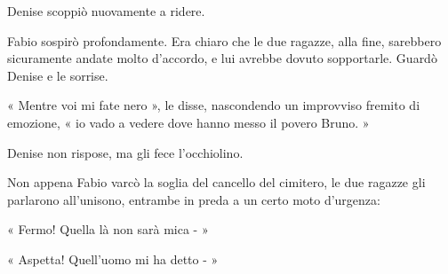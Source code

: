 Denise scoppiò nuovamente a ridere.

Fabio sospirò profondamente. Era chiaro che le due ragazze, alla fine, sarebbero sicuramente andate molto d'accordo, e lui avrebbe dovuto sopportarle. Guardò Denise e le sorrise.

« Mentre voi mi fate nero », le disse, nascondendo un improvviso fremito di emozione, « io vado a vedere dove hanno messo il povero Bruno. »

Denise non rispose, ma gli fece l'occhiolino.

Non appena Fabio varcò la soglia del cancello del cimitero, le due ragazze gli parlarono all'unisono, entrambe in preda a un certo moto d'urgenza:

« Fermo! Quella là non sarà mica - »

« Aspetta! Quell'uomo mi ha detto - »


